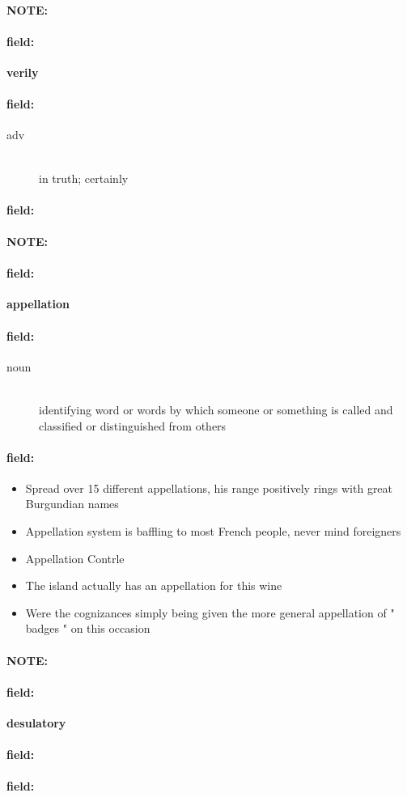 \documentclass[12pt]{article}
\newenvironment{note}{\paragraph{NOTE:}}{}
\newenvironment{field}{\paragraph{field:}}{}
\begin{document}
\begin{note}
\begin{field}
\textbf{\large verily}
\end{field}


\begin{field}
\begin{description}
\item[adv] \hfill \\ 
in truth; certainly

\end{description}
\end{field}

\begin{field}
\end{field}
\end{note}
\begin{note}
\begin{field}
\textbf{\large appellation}
\end{field}


\begin{field}
\begin{description}
\item[noun] \hfill \\ 
identifying word or words by which someone or something is called and classified or distinguished from others

\end{description}
\end{field}

\begin{field}
\begin{itemize}
\item Spread over 15 different appellations, his range positively rings with great Burgundian names
\item Appellation system is baffling to most French people, never mind foreigners
\item Appellation Contrle
\item The island actually has an appellation for this wine
\item Were the cognizances simply being given the more general appellation of " badges " on this occasion
\end{itemize}
\end{field}
\end{note}
\begin{note}
\begin{field}
\textbf{\large desulatory}
\end{field}


\begin{field}
\end{field}

\begin{field}
\end{field}
\end{note}
\end{document}
